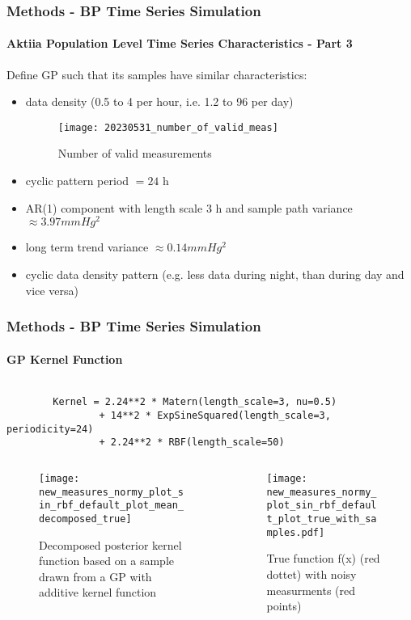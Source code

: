 \documentclass[
	8pt, %
]{beamer}
\begin{document}
\begin{frame}
	\frametitle{Methods - BP Time Series Simulation}
	\framesubtitle{Aktiia Population Level Time Series Characteristics - Part 3}

	Define GP such that its samples have similar characteristics:

	\begin{itemize}
		\item data density (0.5 to 4 per hour, i.e. 1.2 to 96 per day)
		\begin{figure}
			\texttt{[image: 20230531\_number\_of\_valid\_meas]}
			\caption{Number of valid measurements}
		\end{figure}
		\item cyclic pattern period $= 24$ h
		\item AR(1) component with length scale 3 h and sample path variance $\approx 3.97 mmHg^2$
		\item long term trend variance $\approx 0.14 mmHg^2$
		\item cyclic data density pattern (e.g. less data during night, than during day and vice versa)
	\end{itemize}

\end{frame}

\begin{frame}[fragile]
	\frametitle{Methods - BP Time Series Simulation}
	\framesubtitle{GP Kernel Function}

	\begin{verbatim}

		Kernel = 2.24**2 * Matern(length_scale=3, nu=0.5)
				+ 14**2 * ExpSineSquared(length_scale=3, periodicity=24)
				+ 2.24**2 * RBF(length_scale=50)

	\end{verbatim}

	\begin{columns}[c] %
		\begin{column}{0.5\textwidth} %
				\begin{figure}
					\texttt{[image: new\_measures\_normy\_plot\_sin\_rbf\_default\_plot\_mean\_decomposed\_true]}
					\caption{Decomposed posterior kernel function based on a sample drawn from
					a GP with additive kernel function}
				\end{figure}
		\end{column}
		\begin{column}{0.5\textwidth} %
				\begin{figure}
					\texttt{[image: new\_measures\_normy\_plot\_sin\_rbf\_default\_plot\_true\_with\_samples.pdf]}
					\caption{True function f(x) (red dottet) with noisy measurments (red points)}
				\end{figure}

		\end{column}
	\end{columns}

\end{frame}
\end{document}

